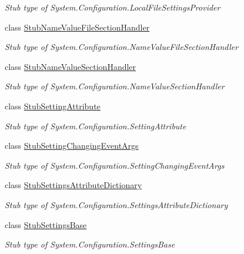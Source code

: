 \begin{DoxyCompactItemize}
\begin{DoxyCompactList}\small\item\em Stub type of System.\-Configuration.\-Local\-File\-Settings\-Provider\end{DoxyCompactList}\item 
class \hyperlink{class_system_1_1_configuration_1_1_fakes_1_1_stub_name_value_file_section_handler}{Stub\-Name\-Value\-File\-Section\-Handler}
\begin{DoxyCompactList}\small\item\em Stub type of System.\-Configuration.\-Name\-Value\-File\-Section\-Handler\end{DoxyCompactList}\item 
class \hyperlink{class_system_1_1_configuration_1_1_fakes_1_1_stub_name_value_section_handler}{Stub\-Name\-Value\-Section\-Handler}
\begin{DoxyCompactList}\small\item\em Stub type of System.\-Configuration.\-Name\-Value\-Section\-Handler\end{DoxyCompactList}\item 
class \hyperlink{class_system_1_1_configuration_1_1_fakes_1_1_stub_setting_attribute}{Stub\-Setting\-Attribute}
\begin{DoxyCompactList}\small\item\em Stub type of System.\-Configuration.\-Setting\-Attribute\end{DoxyCompactList}\item 
class \hyperlink{class_system_1_1_configuration_1_1_fakes_1_1_stub_setting_changing_event_args}{Stub\-Setting\-Changing\-Event\-Args}
\begin{DoxyCompactList}\small\item\em Stub type of System.\-Configuration.\-Setting\-Changing\-Event\-Args\end{DoxyCompactList}\item 
class \hyperlink{class_system_1_1_configuration_1_1_fakes_1_1_stub_settings_attribute_dictionary}{Stub\-Settings\-Attribute\-Dictionary}
\begin{DoxyCompactList}\small\item\em Stub type of System.\-Configuration.\-Settings\-Attribute\-Dictionary\end{DoxyCompactList}\item 
class \hyperlink{class_system_1_1_configuration_1_1_fakes_1_1_stub_settings_base}{Stub\-Settings\-Base}
\begin{DoxyCompactList}\small\item\em Stub type of System.\-Configuration.\-Settings\-Base\end{DoxyCompactList}\item 

\end{DoxyCompactItemize}
